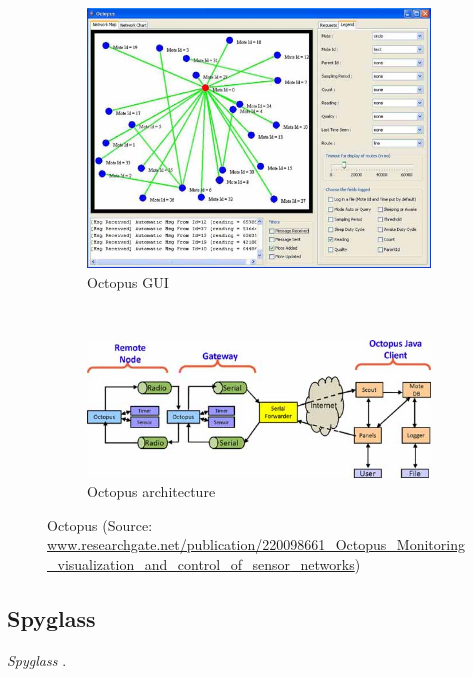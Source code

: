 \begin{figure}
    \centering
    \begin{subfigure}[b]{0.5\textwidth}
      \includegraphics[width=\textwidth]{res/octopus.png}
      \caption{Octopus GUI}
      \label{fig:octopus_gui}
    \end{subfigure}
    ~
    \begin{subfigure}[b]{0.5\textwidth}
        \includegraphics[width=\textwidth]{res/octopus_archi.png}
        \caption{Octopus architecture}
        \label{fig:octopus_archi}
    \end{subfigure}
    \caption{Octopus (Source: \url{www.researchgate.net/publication/220098661_Octopus_Monitoring_visualization_and_control_of_sensor_networks})}
    \label{fig:octopus}
\end{figure}

\subsection{Spyglass}
\textit{Spyglass} \cite{buschmann2005spyglass}.

